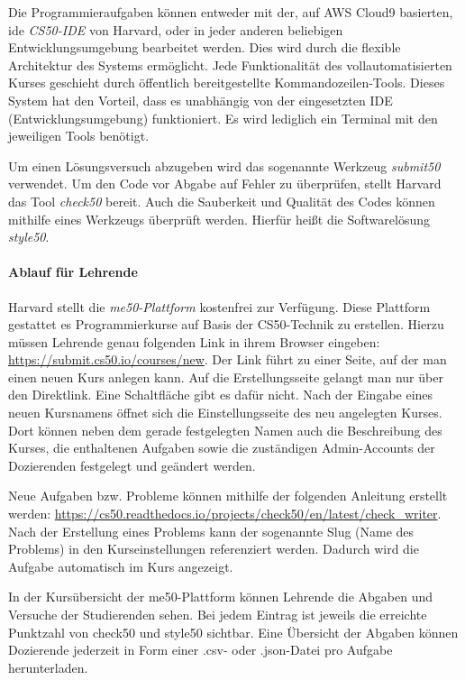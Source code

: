 Die Programmieraufgaben können entweder mit der, auf AWS Cloud9 basierten,
\ac{ide} \emph{CS50-IDE} von Harvard, oder in jeder anderen beliebigen
Entwicklungsumgebung bearbeitet werden. Dies wird durch die flexible Architektur
des Systems ermöglicht. Jede Funktionalität des vollautomatisierten Kurses
geschieht durch öffentlich bereitgestellte Kommandozeilen-Tools. Dieses System
hat den Vorteil, dass es unabhängig von der eingesetzten IDE
(Entwicklungsumgebung) funktioniert. Es wird lediglich ein Terminal mit den
jeweiligen Tools benötigt. \parencite{cs50-ide}

Um einen Lösungsversuch abzugeben wird das sogenannte Werkzeug \emph{submit50}
verwendet. Um den Code vor Abgabe auf Fehler zu überprüfen, stellt Harvard das
Tool \emph{check50} bereit. Auch die Sauberkeit und Qualität des Codes können
mithilfe eines Werkzeugs überprüft werden. Hierfür heißt die Softwarelösung
\emph{style50}. \parencite{submit50}

\paragraph{Ablauf für Lehrende}
Harvard stellt die \emph{me50-Plattform} kostenfrei zur Verfügung. Diese
Plattform gestattet es Programmierkurse auf Basis der CS50-Technik zu
erstellen. Hierzu müssen Lehrende genau folgenden Link in ihrem Browser
eingeben: \url{https://submit.cs50.io/courses/new}. Der Link führt zu einer
Seite, auf der man einen neuen Kurs anlegen kann. Auf die Erstellungsseite
gelangt man nur über den Direktlink. Eine Schaltfläche gibt es dafür nicht.
Nach der Eingabe eines neuen Kursnamens öffnet sich die Einstellungsseite des
neu angelegten Kurses. Dort können neben dem gerade festgelegten Namen auch die
Beschreibung des Kurses, die enthaltenen Aufgaben sowie die zuständigen
Admin-Accounts der Dozierenden festgelegt und geändert werden.

Neue Aufgaben bzw. Probleme können mithilfe der folgenden Anleitung
erstellt werden:
\url{https://cs50.readthedocs.io/projects/check50/en/latest/check_writer}. Nach
der Erstellung eines Problems kann der sogenannte Slug (Name des Problems) in
den Kurseinstellungen referenziert werden. Dadurch wird die Aufgabe automatisch
im Kurs angezeigt.

In der Kursübersicht der me50-Plattform können Lehrende die Abgaben und Versuche
der Studierenden sehen. Bei jedem Eintrag ist jeweils die erreichte Punktzahl
von check50 und style50 sichtbar. Eine Übersicht der Abgaben können Dozierende
jederzeit in Form einer .csv- oder .json-Datei pro Aufgabe herunterladen.

